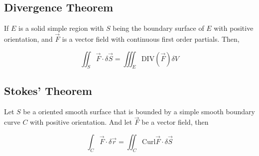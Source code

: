\documentclass{article}
\begin{document}
\subsection{Divergence Theorem}

If $E$ is a solid simple region with $S$ being the boundary surface of $E$ with positive orientation, and $\vec{F}$ is a vector field with continuous first order partials. Then,

$$\iint_S \vec{F} \cdot \delta \vec{S} = \iiint_E \text{DIV} (\vec{F}) \delta V$$

\subsection{Stokes' Theorem}

Let $S$ be a oriented smooth surface that is bounded by a simple smooth boundary curve $C$ with positive orientation. And let $\vec{F}$ be a vector field, then

$$\int_C \vec{F} \cdot \delta \vec{r} = \iint_{C} \text{Curl}\vec{F} \cdot \delta \vec{S}$$
\end{document}
